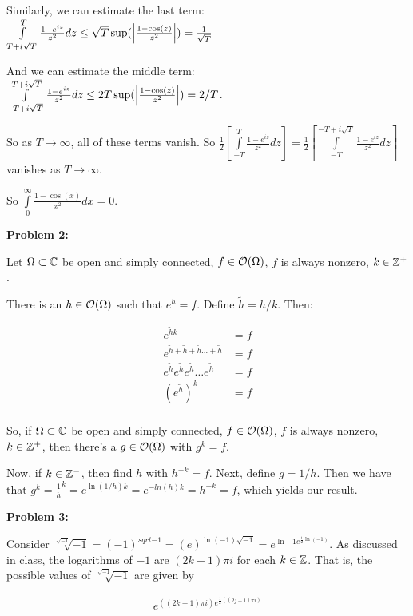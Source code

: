 \documentclass[a4paper,12pt]{article}
\begin{document}
Similarly, we can estimate the last term: $\int\limits_{T+i\sqrt{T}}^T \frac{1-e^{iz}}{z^2} dz \leq \sqrt{T} \sup(\left\lvert \frac{1-\cos(z)}{z^2} \right\rvert) = \frac{1}{\sqrt{T}}$

And we can estimate the middle term: $\int\limits_{-T+i\sqrt{T}}^{T+i\sqrt{T}} \frac{1-e^{iz}}{z^2} dz \leq 2T \sup(\left\lvert \frac{1-\cos(z)}{z^2} \right\rvert) = 2/T$.

So as $T \to \infty$, all of these terms vanish. So $\frac{1}{2}\left[\int\limits_{-T}^T \frac{1-e^{iz}}{z^2} dz \right] = \frac{1}{2}\left[\int\limits_{-T}^{-T+i\sqrt{T}} \frac{1-e^{iz}}{z^2} dz \right]$ vanishes as $T \to \infty$.

So $\int\limits_0^\infty \frac{1-\cos(x)}{x^2} dx = 0$.

\shunt

{\bf Problem 2:}

Let $\Omega \subset \mathbb{C}$ be open and simply connected, $f \in \mathcal{O} (\Omega)$, $f$ is always nonzero, $k \in \mathbb{Z}^+$.

There is an $h \in \mathcal{O}(\Omega)$ such that $e^h =f$. Define $\tilde{h} = h/k$. Then:

\begin{align*}
e^{\tilde{h}k} &= f\\
e^{\tilde{h}+\tilde{h}+\tilde{h} \ldots +\tilde{h}} &= f\\
e^{\tilde{h}}e^{\tilde{h}}e^{\tilde{h}} \ldots e^{\tilde{h}} &= f\\
(e^{\tilde{h}})^k &= f\\
\end{align*}

So, if $\Omega \subset \mathbb{C}$ be open and simply connected, $f \in \mathcal{O} (\Omega)$, $f$ is always nonzero, $k \in \mathbb{Z}^+$, then there's a $g \in \mathcal{O}(\Omega)$ with $g^k = f$.

Now, if $k \in \mathbb{Z}^-$, then find $h$ with $h^{-k} = f$. Next, define $g = 1/h$. Then we have that $g^k = \frac{1}{h}^k =e^{\ln(1/h)k} = e^{-ln(h)k}= h^{-k} = f$, which yields our result.

\shunt

{\bf Problem 3:}

Consider $\sqrt[\sqrt{-1}]{-1} = (-1)^{sqrt{-1}} = (e)^{\ln(-1)\sqrt{-1}} = e^{\ln{-1}e^{\frac{1}{2}\ln(-1)}}$. As discussed in class, the logarithms of $-1$ are $(2k+1)\pi i$ for each $k \in \mathbb{Z}$. That is, the possible values of $\sqrt[\sqrt{-1}]{-1}$ are given by 

\begin{align*}
e^{((2k+1)\pi i)e^{\frac{1}{2}((2j+1)\pi i)}} 
\end{align*} %
\end{document}

